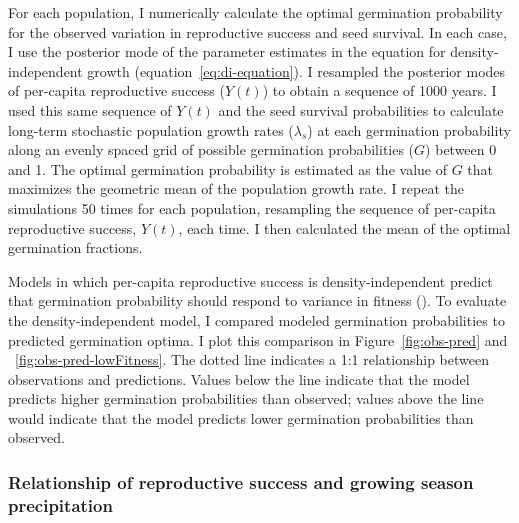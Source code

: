 \documentclass[12pt, oneside]{article}   	%
\begin{document}
For each population, I numerically calculate the optimal germination probability for the observed variation in reproductive success and seed survival. In each case, I use the posterior mode of the parameter estimates in the equation for density-independent growth (equation~\eqref{eq:di-equation}). I resampled the posterior modes of per-capita reproductive success ($Y(t)$) to obtain a sequence of 1000 years. I used this same sequence of $Y(t)$ and the seed survival probabilities to calculate long-term stochastic population growth rates ($\lambda_s$) at each germination probability along an evenly spaced grid of possible germination probabilities ($G$) between 0 and 1. The optimal germination probability is estimated as the value of $G$ that maximizes the geometric mean of the population growth rate. I repeat the simulations 50 times for each population, resampling the sequence of per-capita reproductive success, $Y(t)$, each time. I then calculated the mean of the optimal germination fractions. 


Models in which per-capita reproductive success is density-independent predict that germination probability should respond to variance in fitness (\cite{cohen1966}). To evaluate the density-independent model, I compared modeled germination probabilities to predicted germination optima. I plot this comparison in Figure~\ref{fig:obs-pred} and ~\ref{fig:obs-pred-lowFitness}. The dotted line indicates a 1:1 relationship between observations and predictions. Values below the line indicate that the model predicts higher germination probabilities than observed; values above the line would indicate that the model predicts lower germination probabilities than observed.

\subsubsection{Relationship of reproductive success and growing season precipitation}
\end{document}
